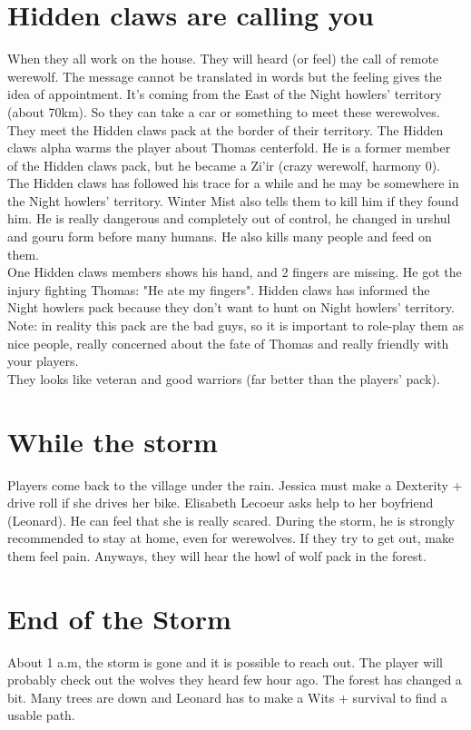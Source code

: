 \documentclass[oneside,12pt]{book}
\begin{document}
\begin{flushleft}
\section{Hidden claws are calling you}
When they all work on the house. They will heard (or feel) the call of remote werewolf. 
The message cannot be translated in words but the feeling gives the idea of appointment.
It's coming from the East of the Night howlers' territory (about 70km). 
So they can take a car or something to meet these werewolves. They meet the Hidden claws pack at the border of their territory. 
The Hidden claws alpha warms the player about Thomas centerfold. He is a former member of the Hidden claws pack, but he became a Zi'ir (crazy werewolf, harmony 0). The Hidden claws has followed his trace for a while and he may be somewhere in the Night howlers' territory. 
Winter Mist also tells them to kill him if they found him. He is really dangerous and completely out of control, he changed in urshul and gouru form before many humans. 
He also kills many people and feed on them. \\ 
One Hidden claws members shows his hand, and 2 fingers are missing. He got the injury fighting Thomas: "He ate my fingers".
Hidden claws has informed the Night howlers pack because they don't want to hunt on Night howlers' territory.  \\
Note: in reality this pack are the bad guys, so it is important to role-play them as nice people, really concerned about the fate of Thomas and really friendly with your players. \\
They looks like veteran and good warriors (far better than the players' pack). \\






\section{While the storm}
Players come back to the village under the rain. Jessica must make a Dexterity + drive roll if she drives her bike. 
Elisabeth Lecoeur asks help to her boyfriend (Leonard). He can feel that she is really scared.
During the storm, he is strongly recommended to stay at home, even for werewolves. If they try to get out, make them feel pain. 
Anyways, they will hear the howl of wolf pack in the forest. 

\section{End of the Storm}
About 1 a.m, the storm is gone and it is possible to reach out. 
The player will probably check out the wolves they heard few hour ago. 
The forest has changed a bit. Many trees are down and Leonard has to make a Wits + survival to find a usable path. 


\end{flushleft}
\end{document}
